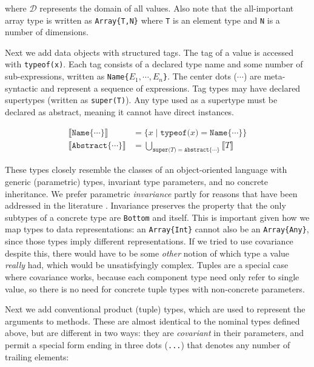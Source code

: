 \noindent
where $\mathcal{D}$ represents the domain of all values.
Also note that the all-important array type is written as \texttt{Array\{T,N\}} where
\texttt{T} is an element type and \texttt{N} is a number of dimensions.

Next we add data objects with structured tags.
The tag of a value is accessed with \texttt{typeof(x)}.
Each tag consists of a declared type name and some number of sub-expressions,
written as \texttt{Name\{}$E_1, \cdots, E_n$\texttt{\}}.
The center dots ($\cdots$) are meta-syntactic and represent a sequence of expressions.
Tag types may have declared supertypes (written as \texttt{super(T)}).
Any type used as a supertype must be declared as abstract, meaning it
cannot have direct instances.

\vspace{-3ex}
\begin{align*}
  \llbracket \texttt{Name\{}\cdots\texttt{\}} \rrbracket &= \{ x\mid \texttt{typeof(}x\texttt{)} = \texttt{Name\{}\cdots\texttt{\}} \} \\
  \llbracket \texttt{Abstract\{}\cdots\texttt{\}} \rrbracket &= \bigcup_{\texttt{super(}T\texttt{)} = \texttt{Abstract\{}\cdots\texttt{\}}} \llbracket T \rrbracket
\end{align*}

These types closely resemble the classes of an object-oriented language with
generic (parametric) types, invariant type parameters, and no concrete inheritance.
We prefer parametric \emph{invariance} partly for reasons that have been addressed in the
literature \cite{Day:1995:SVC:217838.217852}.
Invariance preserves the property that the only subtypes of a concrete type are \texttt{Bottom}
and itself.
This is important given how we map types to data representations: an \texttt{Array\{Int\}}
cannot also be an \texttt{Array\{Any\}}, since those types imply different
representations.
If we tried to use covariance despite this, there would have to be some \emph{other}
notion of which type a value \emph{really} had, which would be unsatisfyingly
complex.
Tuples are a special case where covariance works, because each component type need
only refer to single value, so there is no need for concrete
tuple types with non-concrete parameters.

Next we add conventional product (tuple) types, which are used to represent the
arguments to methods. These are almost identical to the nominal types defined above,
but are different in two ways: they are \emph{covariant} in their parameters, and permit
a special form ending in three dots (\texttt{...}) that denotes any number of trailing
elements:

